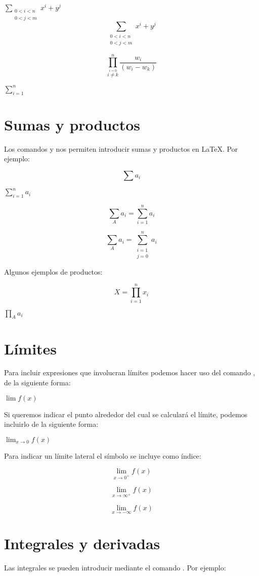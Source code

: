 \documentclass[letterpaper,12pt]{article}
\begin{document}
$\sum_{\substack{0<i<n\\0<j<m}} x^i + y^j$
$$\sum_{\substack{0<i<n\\0<j<m}} x^i + y^j$$

\[ \prod_{\overset{i=0}{i\neq k}}^{n}\frac{w_i}{(w_i-w_k)} \]

$\sum_{i=1}^{n}	$
\section{Sumas y productos}

Los comandos \verb@\sum@ y \verb@prod@ nos permiten introducir sumas y productos en \LaTeX{}. Por ejemplo:

$$\sum a_i$$

$\displaystyle \sum_{i=1}^n a_i$

$$\sum_{A} a_i = \sum_{i=1}^n a_i $$

$$\sum_{A} a_i = \sum_{\substack{i=1\\j=0}}^n a_i $$

Algunos ejemplos de productos:

$$X= \prod_{i=1}^n x_i$$

$\displaystyle \prod_{A} a_i$

\section{Límites}

Para incluir expresiones que involucran límites podemos hacer uso del comando \verb@\lim@, de la siguiente forma:

$\displaystyle \lim f(x)$

Si queremos indicar el punto alrededor del cual se calculará el límite, podemos incluirlo de la siguiente forma:

$\displaystyle \lim_{x\to 0} f(x) $

Para indicar un límite lateral el símbolo se incluye como índice:

\[ \lim_{x \rightarrow 0^{+}} f(x) \]

\[ \lim_{x \rightarrow \infty^{+}} f(x) \]

\[ \lim_{x \to -\infty} f(x) \]

\section{Integrales y derivadas}

Las integrales se pueden introducir mediante el comando \verb@\int@. Por ejemplo:
\end{document}
